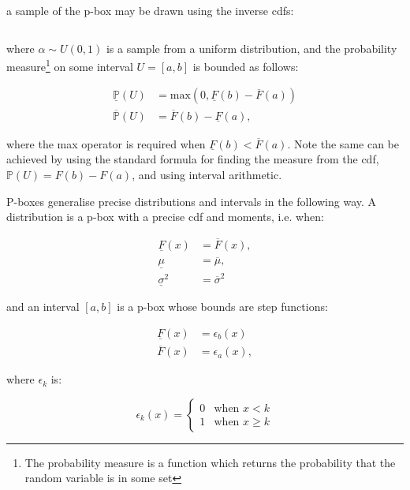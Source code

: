 \documentclass{juliacon}
\begin{document}
\noindent a sample of the p-box may be drawn using the inverse cdfs: 

\begin{equation*}
  [\underline{F}^{-1}(\alpha), \overline{F}^{-1}(\alpha)]
\end{equation*}

\noindent where $\alpha \sim U(0,1)$ is a sample from a uniform distribution, and the probability measure\footnote{The probability measure is a function which returns the probability that the random variable is in some set} on some interval $U = [a, b]$ is bounded as follows:

\begin{align*}
  \underline{\mathbb{P}}(U) &= \text{max}(0, \underline{F}(b) - \overline{F}(a)) \\ 
  \overline{\mathbb{P}}(U)  &= \overline{F}(b) - \underline{F}(a) ,
\end{align*}

where the max operator is required when $\underline{F}(b) < \overline{F}(a)$. Note the same can be achieved by using the standard formula for finding the measure from the cdf, $\mathbb{P}(U) = F(b)- F(a)$, and using interval arithmetic.


P-boxes generalise precise distributions and intervals in the following way. A distribution is a p-box with a precise cdf and moments, i.e. when: 

\begin{align*}
  \underline{F}(x) &= \overline{F}(x), \\ 
  \underline{\mu}  &= \overline{\mu}, \\ 
  \underline{\sigma}^2 &= \overline{\sigma}^2
\end{align*}

\noindent and an interval $[a,b]$ is a p-box whose bounds are step functions: 

\begin{align*}
    \underline{F}(x) &= \epsilon_{b}(x)\\
    \overline{F}(x) &= \epsilon_{a}(x) ,
\end{align*}

\noindent where $\epsilon_k$ is: 

\begin{equation*}
   \epsilon_k(x) = \begin{cases} 0 &\text{when } x < k \\ 1 &\text{when } x \geq k \end{cases}
\end{equation*}
\end{document}
